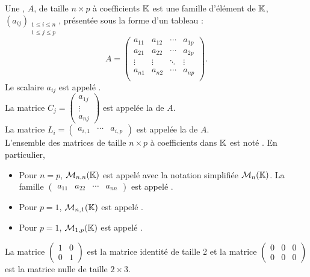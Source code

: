 \documentclass{book}
\begin{document}
\begin{Definition}[Matrice]
Une , $A$,  de taille $n\times p$  à coefficients  $\mathbb{K} $ est une famille d'élément de $\mathbb{K} $, $(a_{ij})_{\substack{1\leq i\leq n\\1\leq j\leq p}}$, présentée sous la forme d'un tableau :
$$ A=\begin{pmatrix}
a_{11} & a_{12} & \cdots & a_{1p}\\
a_{21} & a_{22} & \cdots & a_{2p}\\
\vdots & \vdots & \ddots & \vdots\\
a_{n1} & a_{n2} & \cdots & a_{np}\\
\end{pmatrix}.$$
Le scalaire $a_{ij}$ est appelé .\\
La matrice $C_j=\begin{pmatrix}
a_{1j}\\
\vdots\\
a_{nj}
\end{pmatrix}$ est appelée la  de $A$. \\
La matrice $L_i=\begin{pmatrix}
a_{i,1}&\cdots&a_{i,p}
\end{pmatrix}$ est appelée la  de $A$.\\ 
L'ensemble des matrices de taille $n\times p$ à coefficients dans $\mathbb{K}$ est noté . En particulier,
\begin{itemize}
\item Pour $n=p$, $\mathcal{M}_{n,n}(\mathbb{K})$ est appelé  avec la notation simplifiée $\mathcal{M}_{n}(\mathbb{K})$. La famille $\begin{pmatrix}
a_{11}&a_{22}&\cdots&a_{nn}
\end{pmatrix}$ est appelé .
\item Pour $p=1$, $\mathcal{M}_{n,1}(\mathbb{K})$ est appelé .
\item Pour $p=1$, $\mathcal{M}_{1,p}(\mathbb{K})$ est appelé .
\end{itemize}
\end{Definition}
\begin{Exemple}
La matrice  $\begin{pmatrix}
1&0 \\0&1
\end{pmatrix}$ est la matrice identité de taille 2 et la matrice $\begin{pmatrix}
0&0&0 \\0&0&0
\end{pmatrix}$ est la  matrice nulle de taille $2\times 3$.
\end{Exemple}
\end{document}

